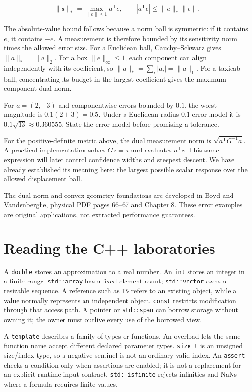 \[
\|a\|_* = \max_{\|e\|\le1} a^{\mathsf T}e,
\qquad |a^{\mathsf T}e|\le\|a\|_*\|e\|.
\]

The absolute-value bound follows because a norm ball is symmetric: if it contains \(e\), it contains \(-e\). A measurement is therefore bounded by its sensitivity norm times the allowed error size. For a Euclidean ball, Cauchy--Schwarz gives \(\|a\|_* =\|a\|_2\). For a box \(\|e\|_\infty\le1\), each component can align independently with its coefficient, so \(\|a\|_* =\sum_i|a_i|=\|a\|_1\). For a taxicab ball, concentrating its budget in the largest coefficient gives the maximum-component dual norm.

For \(a=(2,-3)\) and componentwise errors bounded by \(0.1\), the worst magnitude is \(0.1(2+3)=0.5\). Under a Euclidean radius-\(0.1\) error model it is \(0.1\sqrt{13}\approx0.360555\). State the error model before promising a tolerance.

For the positive-definite metric above, the dual measurement norm is \(\sqrt{a^{\mathsf T}G^{-1}a}\). A practical implementation solves \(Gz=a\) and evaluates \(a^{\mathsf T}z\). This same expression will later control confidence widths and steepest descent. We have already established its meaning here: the largest possible scalar response over the allowed displacement ball.

The dual-norm and convex-geometry foundations are developed in Boyd and Vandenberghe, physical PDF pages 66--67 and Chapter 8. These error examples are original applications, not extracted performance guarantees.

\section{Reading the C++ laboratories}\label{01-foundations-i-ch017-reading-the-c-laboratories}

A \texttt{double} stores an approximation to a real number. An \texttt{int} stores an integer in a finite range. \texttt{std::array} has a fixed element count; \texttt{std::vector} owns a resizable sequence. A reference such as \texttt{T\&} refers to an existing object, while a value normally represents an independent object. \texttt{const} restricts modification through that access path. A pointer or \texttt{std::span} can borrow storage without owning it; the owner must outlive every use of the borrowed view.

A \texttt{template} describes a family of types or functions. An overload lets the same function name accept different declared parameter types. \texttt{size\_t} is an unsigned size/index type, so a negative sentinel is not an ordinary valid index. An \texttt{assert} checks a condition only when assertions are enabled; it is not a replacement for an explicit runtime input contract. \texttt{std::isfinite} rejects infinities and NaNs where a formula requires finite values.

